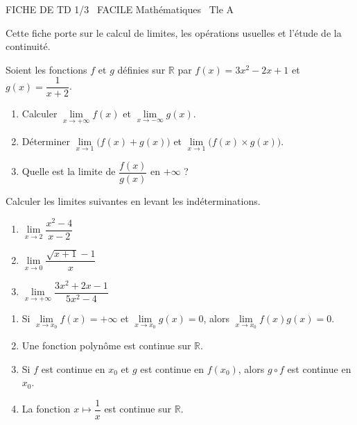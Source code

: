 \documentclass[11pt]{article}
\begin{document}
\begin{tcolorbox}[enhanced,colback=popink,colframe=popink,arc=10pt,boxrule=0pt,left=12pt,right=12pt,top=9pt,bottom=9pt]
{\color{white}\popxbold\small FICHE DE TD 1/3 \textbullet\ FACILE \hfill Mathématiques \textbullet\ Tle A\par}
\end{tcolorbox}
\vspace{4pt}
Cette fiche porte sur le calcul de limites, les opérations usuelles et l'étude de la continuité.

\begin{exercice}
Soient les fonctions $f$ et $g$ définies sur $\mathbb{R}$ par $f(x)=3x^2-2x+1$ et $g(x)=\dfrac{1}{x+2}$.
\begin{enumerate}
    \item Calculer $\lim\limits_{x\to +\infty} f(x)$ et $\lim\limits_{x\to -\infty} g(x)$.
    \item Déterminer $\lim\limits_{x\to 1} \bigl(f(x)+g(x)\bigr)$ et $\lim\limits_{x\to 1} \bigl(f(x)\times g(x)\bigr)$.
    \item Quelle est la limite de $\dfrac{f(x)}{g(x)}$ en $+\infty$ ?
\end{enumerate}
\end{exercice}

\begin{exercice}
Calculer les limites suivantes en levant les indéterminations.
\begin{enumerate}
    \item $\lim\limits_{x\to 2} \dfrac{x^2-4}{x-2}$
    \item $\lim\limits_{x\to 0} \dfrac{\sqrt{x+1}-1}{x}$
    \item $\lim\limits_{x\to +\infty} \dfrac{3x^2+2x-1}{5x^2-4}$
\end{enumerate}
\end{exercice}

\begin{exercice}
\begin{enumerate}
    \item Si $\lim\limits_{x\to x_0} f(x)=+\infty$ et $\lim\limits_{x\to x_0} g(x)=0$, alors $\lim\limits_{x\to x_0} f(x)g(x)=0$.
    \item Une fonction polynôme est continue sur $\mathbb{R}$.
    \item Si $f$ est continue en $x_0$ et $g$ est continue en $f(x_0)$, alors $g\circ f$ est continue en $x_0$.
    \item La fonction $x\mapsto \dfrac{1}{x}$ est continue sur $\mathbb{R}$.
\end{enumerate}
\end{exercice}
\end{document}

